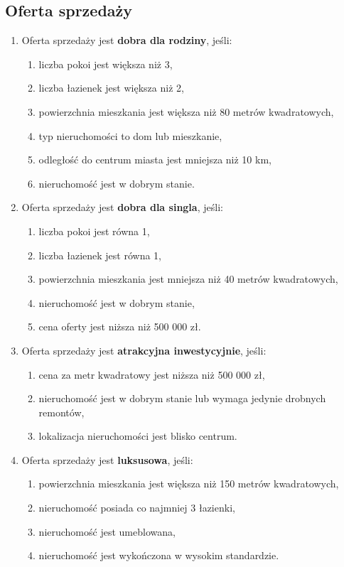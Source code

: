 \subsection{Oferta sprzedaży}
\begin{enumerate}[label=S\arabic*.]
    \item Oferta sprzedaży jest \textbf{dobra dla rodziny}, jeśli:
    \begin{enumerate}[label=\arabic*.]
        \item liczba pokoi jest większa niż 3,
        \item liczba łazienek jest większa niż 2,
        \item powierzchnia mieszkania jest większa niż 80 metrów kwadratowych,
        \item typ nieruchomości to dom lub mieszkanie,
        \item odległość do centrum miasta jest mniejsza niż 10 km,
        \item nieruchomość jest w dobrym stanie.
    \end{enumerate}
    \item Oferta sprzedaży jest \textbf{dobra dla singla}, jeśli:
    \begin{enumerate}[label=\arabic*.]
        \item liczba pokoi jest równa 1,
        \item liczba łazienek jest równa 1,
        \item powierzchnia mieszkania jest mniejsza niż 40 metrów kwadratowych,
        \item nieruchomość jest w dobrym stanie,
        \item cena oferty jest niższa niż 500 000 zł.
    \end{enumerate}
    \item Oferta sprzedaży jest \textbf{atrakcyjna inwestycyjnie}, jeśli:
    \begin{enumerate}[label=\arabic*.]
        \item cena za metr kwadratowy jest niższa niż 500 000 zł,
        \item nieruchomość jest w dobrym stanie lub wymaga jedynie drobnych remontów,
        \item lokalizacja nieruchomości jest blisko centrum.
    \end{enumerate}
    \item Oferta sprzedaży jest \textbf{luksusowa}, jeśli:
    \begin{enumerate}[label=\arabic*.]
        \item powierzchnia mieszkania jest większa niż 150 metrów kwadratowych,
        \item nieruchomość posiada co najmniej 3 łazienki,
        \item nieruchomość jest umeblowana,
        \item nieruchomość jest wykończona w wysokim standardzie.
    \end{enumerate}
\end{enumerate}

